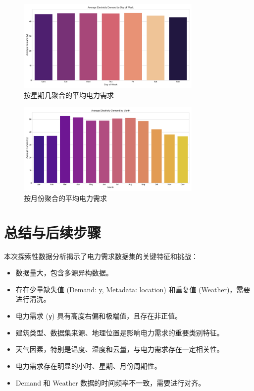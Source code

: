 \documentclass{article} %
\begin{document}
\begin{figure}[H]
    \centering
    \includegraphics[width=0.8\textwidth]{../plots/avg_demand_by_dayofweek_spark.png}
    \caption{按星期几聚合的平均电力需求}
    \label{fig:demand_by_dayofweek}
\end{figure}

\begin{figure}[H]
    \centering
    \includegraphics[width=0.8\textwidth]{../plots/avg_demand_by_month_spark.png}
    \caption{按月份聚合的平均电力需求}
    \label{fig:demand_by_month}
\end{figure}

\section{总结与后续步骤}
\label{sec:conclusion}

本次探索性数据分析揭示了电力需求数据集的关键特征和挑战：
\begin{itemize}
    \item 数据量大，包含多源异构数据。
    \item 存在少量缺失值 (Demand: y, Metadata: location) 和重复值 (Weather)，需要进行清洗。
    \item 电力需求 (\texttt{y}) 具有高度右偏和极端值，且存在非正值。
    \item 建筑类型、数据集来源、地理位置是影响电力需求的重要类别特征。
    \item 天气因素，特别是温度、湿度和云量，与电力需求存在一定相关性。
    \item 电力需求存在明显的小时、星期、月份周期性。
    \item Demand 和 Weather 数据的时间频率不一致，需要进行对齐。
\end{itemize}
\end{document}

